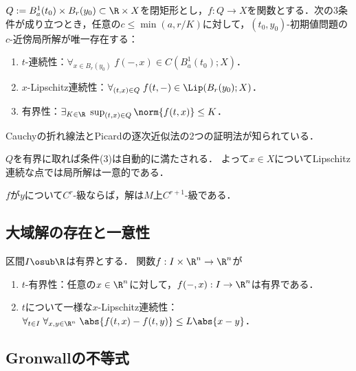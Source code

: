 \documentclass[uplatex,dvipdfmx]{jsreport}
\begin{document}
\begin{theorem}
    $Q:=B^1_a(t_0)\times B_r(y_0)\subset\R\times X$を閉矩形とし，$f:Q\to X$を関数とする．次の3条件が成り立つとき，任意の$c\le\min(a,r/K)$に対して，$(t_0,y_0)$-初期値問題の$c$-近傍局所解が唯一存在する：
    \begin{enumerate}
        \item $t$-連続性：$\forall_{x\in B_r(y_0)}\;f(-,x)\in C(B_a^1(t_0);X)$．
        \item $x$-Lipschitz連続性：$\forall_{(t,x)\in Q}\;f(t,-)\in\Lip(B_r(y_0);X)$．
        \item 有界性：$\exists_{K\in\R}\;\sup_{(t,x)\in Q}\norm{f(t,x)}\le K$．
    \end{enumerate}
\end{theorem}
\begin{Proof}
    Cauchyの折れ線法とPicardの逐次近似法の2つの証明法が知られている．
\end{Proof}
\begin{remarks}
    $Q$を有界に取れば条件(3)は自動的に満たされる．
    よって$x\in X$についてLipschitz連続な点では局所解は一意的である．
\end{remarks}

\begin{corollary}
    $f$が$y$について$C^r$-級ならば，解は$M$上$C^{r+1}$-級である．
\end{corollary}

\subsection{大域解の存在と一意性}

\begin{theorem}\label{thm-Cauchy-Lipschitz-Picard}
    区間$I\osub\R$は有界とする．
    関数$f:I\times\R^n\to\R^n$が
    \begin{enumerate}
        \item $t$-有界性：任意の$x\in\R^n$に対して，$f(-,x):I\to\R^n$は有界である．
        \item $t$について一様な$x$-Lipschitz連続性：$\forall_{t\in I}\;\forall_{x,y\in\R^n}\;\abs{f(t,x)-f(t,y)}\le L\abs{x-y}$．
    \end{enumerate}
\end{theorem}

\subsection{Gronwallの不等式}
\end{document}
